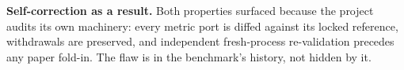 \textbf{Self-correction as a result.} Both properties surfaced because the project audits its own machinery: every metric port is diffed against its locked reference, withdrawals are preserved, and independent fresh-process re-validation precedes any paper fold-in. The flaw is in the benchmark's history, not hidden by it.
